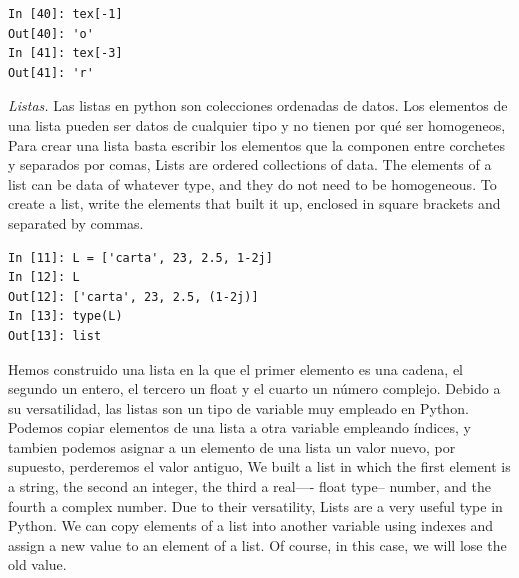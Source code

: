 \begin{center}
    \begin{minipage}{0.3\textwidth}
\begin{verbatim}
In [40]: tex[-1]
Out[40]: 'o'
In [41]: tex[-3]
Out[41]: 'r'
\end{verbatim}
\end{minipage}
\end{center}

\begin{paracol}{2}
\emph{Listas.} Las listas en python son colecciones ordenadas de datos. Los elementos de una lista pueden ser datos de cualquier tipo y no tienen por qué ser homogeneos, Para crear una lista basta escribir los elementos que la componen entre corchetes y separados por comas,
\switchcolumn
Lists are ordered collections of data. The elements of a list can be data of whatever type, and they do not need to be homogeneous. To create a list, write the elements that built it up, enclosed in square brackets and separated by commas.  
\end{paracol}

\begin{center}
    \begin{minipage}{0.4\textwidth}
\begin{verbatim}
In [11]: L = ['carta', 23, 2.5, 1-2j]
In [12]: L
Out[12]: ['carta', 23, 2.5, (1-2j)]
In [13]: type(L)
Out[13]: list
\end{verbatim}
\end{minipage}
\end{center}

\begin{paracol}{2}
Hemos construido una lista en la que el primer elemento es una cadena, el segundo un entero, el tercero un float y el cuarto un número complejo. Debido a su versatilidad, las listas son un tipo de variable muy empleado en Python. Podemos copiar elementos de una lista a otra variable empleando índices, y tambien podemos asignar a un elemento de una lista un valor nuevo, por supuesto, perderemos el valor antiguo,
\switchcolumn
We built a list in which the first element is a string, the second an integer, the third a real—- float type-- number, and the fourth a complex number. Due to their versatility, Lists are a very useful type in Python. We can copy elements of a list into another variable using indexes and assign a new value to an element of a list. Of course, in this case, we will lose the old value. 
\end{paracol}

